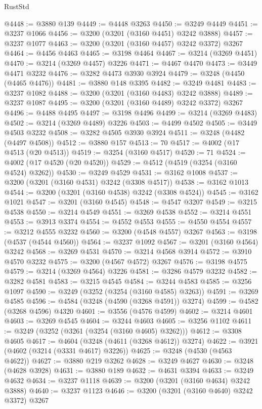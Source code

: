 \begin{lexlean}{RustStd}
\begin{coremodule}
@4448 := @3880 @139
@4449 := @4448 @3263
@4450 := @3249 @4449
@4451 := @3237 @1066
@4456 := @3200 (@3201 (@3160 @4451) @3242 @3888)
@4457 := @3237 @1077
@4463 := @3200 (@3201 (@3160 @4457) @3242 @3372) @3267
@4464 := @4456 @4463
@4465 := @3198 @4464
@4467 := @3214 (@3269 @4451)
@4470 := @3214 (@3269 @4457) @3226
@4471 := @4467 @4470
@4473 := @3449 @4471 @3232
@4476 := @3282 @4473 @3930 @3924
@4479 := @3248 (@4450 (@4465 @4476))
@4481 := @3880 @148 @3395
@4482 := @3249 @4481
@4483 := @3237 @1082
@4488 := @3200 (@3201 (@3160 @4483) @3242 @3888)
@4489 := @3237 @1087
@4495 := @3200 (@3201 (@3160 @4489) @3242 @3372) @3267
@4496 := @4488 @4495
@4497 := @3198 @4496
@4499 := @3214 (@3269 @4483)
@4502 := @3214 (@3269 @4489) @3226
@4503 := @4499 @4502
@4505 := @3449 @4503 @3232
@4508 := @3282 @4505 @3930 @3924
@4511 := @3248 (@4482 (@4497 @4508))
@4512 := @3880 @157
@4513 := 70
@4517 := @4002 (@17 @4513 (@20 @4513))
@4519 := @3254 (@3160 @4517)
@4520 := 71
@4524 := @4002 (@17 @4520 (@20 @4520))
@4529 := @4512 (@4519 (@3254 (@3160 @4524) @3262))
@4530 := @3249 @4529
@4531 := @3162 @1008
@4537 := @3200 (@3201 (@3160 @4531) @3242 (@3308 @4517))
@4538 := @3162 @1013
@4544 := @3200 (@3201 (@3160 @4538) @3242 (@3308 @4524))
@4545 := @3162 @1021
@4547 := @3201 (@3160 @4545)
@4548 := @4547 @3207
@4549 := @3215 @4538
@4550 := @3214 @4549
@4551 := @3269 @4538
@4552 := @3214 @4551
@4553 := @3913 @3374
@4554 := @4552 @4553
@4555 := @4550 @4554
@4557 := @3212 @4555 @3232
@4560 := @3200 (@4548 @4557) @3267
@4563 := @3198 (@4537 (@4544 @4560))
@4564 := @3237 @1092
@4567 := @3201 (@3160 @4564) @3242
@4568 := @3269 @4531
@4570 := @3214 @4568 @3914
@4572 := @3910 @4570 @3232
@4575 := @3200 (@4567 @4572) @3267
@4576 := @3198 @4575
@4579 := @3214 (@3269 @4564) @3226
@4581 := @3286 @4579 @3232
@4582 := @3282 @4581
@4583 := @3215 @4545
@4584 := @3244 @4583
@4585 := @3256 @1097
@4590 := @3249 (@3252 (@3254 (@3160 @4585) @3263))
@4591 := @3269 @4585
@4596 := @4584 (@3248 (@4590 (@3268 @4591)) @3274)
@4599 := @4582 (@3268 @4596) @4320
@4601 := @3556 (@4576 @4599)
@4602 := @3214 @4601
@4603 := @3269 @4545
@4604 := @3244 @4603
@4605 := @3256 @1102
@4611 := @3249 (@3252 (@3261 (@3254 (@3160 @4605) @3262)))
@4612 := @3308 @4605
@4617 := @4604 (@3248 (@4611 (@3268 @4612)) @3274)
@4622 := @3921 (@4602 (@3214 (@3331 @4617) @3226))
@4625 := @3248 (@4530 (@4563 @4622))
@4627 := @3880 @219 @3262
@4628 := @3249 @4627
@4630 := @3248 (@4628 @3928)
@4631 := @3880 @189
@4632 := @4631 @3394
@4633 := @3249 @4632
@4634 := @3237 @1118
@4639 := @3200 (@3201 (@3160 @4634) @3242 @3888)
@4640 := @3237 @1123
@4646 := @3200 (@3201 (@3160 @4640) @3242 @3372) @3267

\end{coremodule}
\end{lexlean}

